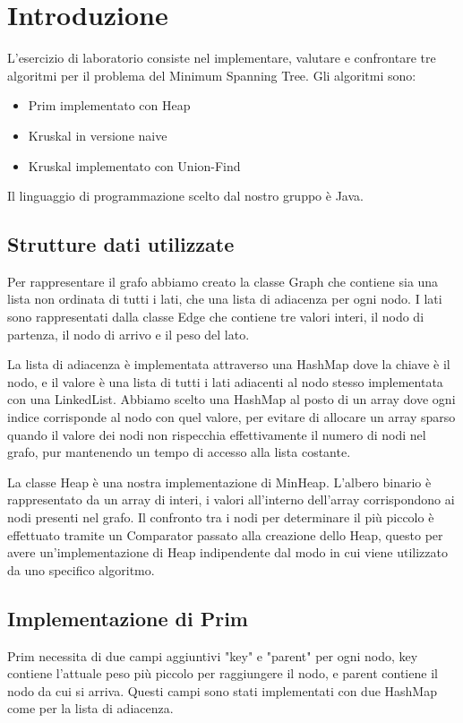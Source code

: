 \section{Introduzione}

L'esercizio di laboratorio consiste nel implementare, valutare e confrontare tre algoritmi per il problema del Minimum Spanning Tree. Gli algoritmi sono:
\begin{itemize}
	\item Prim implementato con Heap
	\item Kruskal in versione naive
	\item Kruskal implementato con Union-Find
\end{itemize} 
Il linguaggio di programmazione scelto dal nostro gruppo è Java.


\subsection{Strutture dati utilizzate}

Per rappresentare il grafo abbiamo creato la classe Graph che contiene sia una lista non ordinata di tutti i lati, che una lista di adiacenza per ogni nodo. 
I lati sono rappresentati dalla classe Edge che contiene tre valori interi, il nodo di partenza, il nodo di arrivo e il peso del lato.

La lista di adiacenza è implementata attraverso una HashMap dove la chiave è il nodo, e il valore è una lista di tutti i lati adiacenti al nodo stesso implementata con una LinkedList. Abbiamo scelto una HashMap al posto di un array dove ogni indice corrisponde al nodo con quel valore, per evitare di allocare un array sparso quando il valore dei nodi non rispecchia effettivamente il numero di nodi nel grafo, pur mantenendo un tempo di accesso alla lista costante.

La classe Heap è una nostra implementazione di MinHeap. L'albero binario è rappresentato da un array di interi, i valori all'interno dell'array corrispondono ai nodi presenti nel grafo. Il confronto tra i nodi per determinare il più piccolo è effettuato tramite un Comparator passato alla creazione dello Heap, questo per avere un'implementazione di Heap indipendente dal modo in cui viene utilizzato da uno specifico algoritmo.

\subsection{Implementazione di Prim}
Prim necessita di due campi aggiuntivi "key" e "parent" per ogni nodo, key contiene l'attuale peso più piccolo per raggiungere il nodo, e parent contiene il nodo da cui si arriva. Questi campi sono stati implementati con due HashMap come per la lista di adiacenza.

